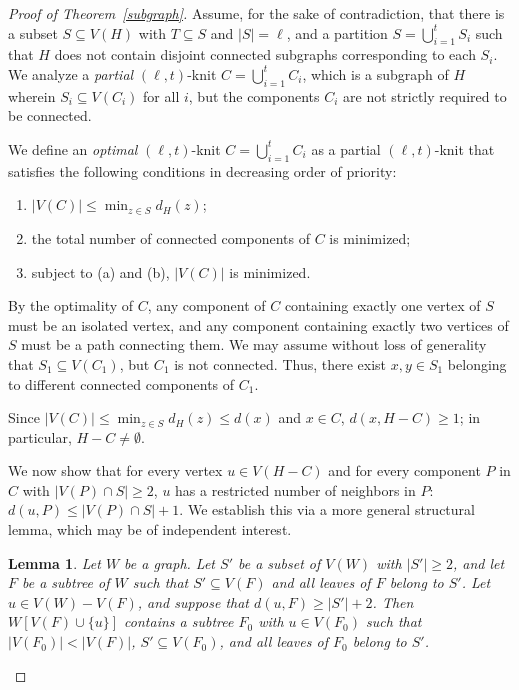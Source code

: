 \documentclass[11pt]{amsart}
\newtheorem{lemma}{Lemma}
\begin{document}
\begin{proof}[Proof of Theorem~\ref{subgraph}]
Assume, for the sake of contradiction, that there is a subset $S \subseteq V(H)$ with $T \subseteq S$ and $|S|=\ell$, and a partition $S=\bigcup_{i=1}^{t} S_i$ such that $H$ does not contain disjoint connected subgraphs corresponding to each $S_i$. We analyze a \emph{partial} $(\ell, t)$-knit $C=\bigcup_{i=1}^t C_i$, which is a subgraph of $H$ wherein $S_i\subseteq V(C_i)$ for all $i$, but the components $C_i$ are not strictly required to be connected.

We define an \emph{optimal} $(\ell, t)$-knit $C=\bigcup_{i=1}^t C_i$ as a partial $(\ell, t)$-knit that satisfies the following conditions in decreasing order of priority:
\begin{enumerate}
\item[(a)] $|V(C)|\le \min_{z\in S} d_H(z)$;
\item[(b)] the total number of connected components of $C$ is minimized;
\item[(c)] subject to (a) and (b), $|V(C)|$ is minimized.
\end{enumerate}

By the optimality of $C$, any component of $C$ containing exactly one vertex of $S$ must be an isolated vertex, and any component containing exactly two vertices of $S$ must be a path connecting them. We may assume without loss of generality that $S_1\subseteq V(C_1)$, but $C_1$ is not connected. Thus, there exist $x, y\in S_1$ belonging to different connected components of $C_1$.

Since  $|V(C)|\le \min_{z\in S} d_H(z)\le d(x)$ and $x\in C$, $d(x, H-C)\ge 1$; in particular, $H-C \neq \emptyset$.


\iffalse %
We now show that for every vertex $u\in V(H-C)$ and for every component $P$ in $C$ with $|V(P)\cap S|\ge 2$, $u$ has a restricted number of neighbors in $P$: $d(u, P)\le |V(P)\cap S|+1$. We establish this via a more general structural lemma, which may be of independent interest.

\begin{lemma}\label{neighbors-in-C}
Let $W$ be a graph. Let $S'$ be a subset of $V(W)$ with $|S'|\ge 2$, and let $F$ be a subtree of $W$ such that $S' \subseteq V(F)$ and all leaves of $F$ belong to $S'$. Let $u\in V(W)-V(F)$, and suppose that $d(u, F)\ge |S'|+2$. Then $W[V(F)\cup \{u\}]$ contains a subtree $F_0$ with $u\in V(F_0)$ such that $|V(F_0)|<|V(F)|$, $S' \subseteq V(F_0)$, and all leaves of $F_0$ belong to $S'$.
\end{lemma}


\end{proof}
\end{document}
